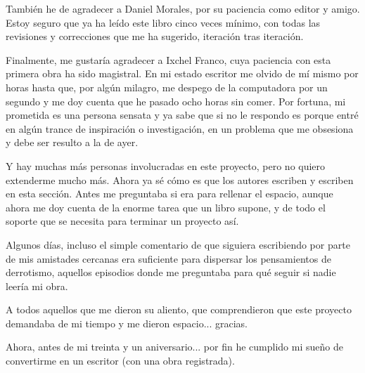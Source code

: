 También he de agradecer a Daniel Morales, por su paciencia como editor y amigo. Estoy seguro que ya ha leído este libro cinco veces mínimo, con todas las revisiones y correcciones que me ha sugerido, iteración tras iteración.

Finalmente, me gustaría agradecer a Ixchel Franco, cuya paciencia con esta primera obra ha sido magistral. En mi estado escritor me olvido de mí mismo por horas hasta que, por algún milagro, me despego de la computadora por un segundo y me doy cuenta que he pasado ocho horas sin comer. Por fortuna, mi prometida es una persona sensata y ya sabe que si no le respondo es porque entré en algún trance de inspiración o investigación, en un problema que me obsesiona y debe ser resulto a la de ayer.

Y hay muchas más personas involucradas en este proyecto, pero no quiero extenderme mucho más. Ahora ya sé cómo es que los autores escriben y escriben en esta sección. Antes me preguntaba si era para rellenar el espacio, aunque ahora me doy cuenta de la enorme tarea que un libro supone, y de todo el soporte que se necesita para terminar un proyecto así.

Algunos días, incluso el simple comentario de que siguiera escribiendo por parte de mis amistades cercanas era suficiente para dispersar los pensamientos de derrotismo, aquellos episodios donde me preguntaba para qué seguir si nadie leería mi obra.

A todos aquellos que me dieron su aliento, que comprendieron que este proyecto demandaba de mi tiempo y me dieron espacio... gracias.

Ahora, antes de mi treinta y un aniversario... por fin he cumplido mi sueño de convertirme en un escritor (con una obra registrada).


